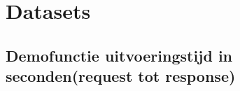 \section{Datasets}
\subsection{Demofunctie uitvoeringstijd in seconden(request tot response)}
\label{sec:uitvoeringstijd-demofunctie}